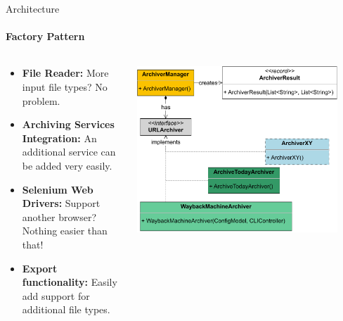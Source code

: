 \documentclass[
ngerman,%
authorontitle=true,
]{bfhbeamer}
\begin{document}
	\begin{frame}{Architecture}
		\framesubtitle{Factory Pattern}
		\begin{columns} %
			\begin{column}{0.5\textwidth} %
				\begin{itemize}
					\item \textbf{File Reader:} More input file types? No problem.
					\item \textbf{Archiving Services Integration:} An additional service can be added very easily.
					\item \textbf{Selenium Web Drivers:} Support another browser? Nothing easier than that!
					\item \textbf{Export functionality:} Easily add support for additional file types.
				\end{itemize}
			\end{column}
			\begin{column}{0.5\textwidth} %
				\begin{center}
					\includegraphics[width=0.9\textwidth]{pictures/final_presentation/ArchiverManager_Color.pdf}
				\end{center}
			\end{column}
		\end{columns} %
	\end{frame}
	
\end{document}

